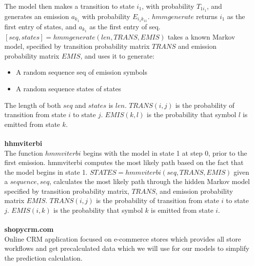 The model then makes a transition to state $i_1$, with probability $T_{1i_1}$, and generates an emission $a_k_1$ with probability $E_{i_1k_11}$.
$hmmgenerate$ returns $i_1$ as the first entry of states, and $a_k_1$ as the first entry of seq.
$[seq,states] = hmmgenerate(len,TRANS,EMIS)$ takes a known Markov model, specified by transition probability matrix $TRANS$ and emission probability matrix $EMIS$,
and uses it to generate:\\
\begin{itemize}
    \item A random sequence seq of emission symbols
    \item A random sequence states of states
\end{itemize}
The length of both $seq$ and $states$ is $len$.
$TRANS(i,j)$ is the probability of transition from state $i$ to state $j$.
$EMIS(k,l)$ is the probability that symbol $l$ is emitted from state $k$.\\
\\
\textbf{hhmviterbi}~\cite{hhmviterbi}\\
The function $hmmviterbi$ begins with the model in state 1 at step 0, prior to the first emission.
hmmviterbi computes the most likely path based on the fact that the model begins in state 1.
$STATES = hmmviterbi(seq,TRANS,EMIS)$ given a $sequence, seq$, calculates the most likely path through the hidden Markov model
specified by transition probability matrix, $TRANS$, and emission probability matrix $EMIS$. $TRANS(i,j)$ is the probability of transition from state $i$ to state $j$.
$EMIS(i,k)$ is the probability that symbol $k$ is emitted from state $i$.\\
\\
\textbf{shopycrm.com}\\
Online CRM application focused on e-commerce stores which provides all store workflows and get precalculated data which
we will use for our models to simplify the prediction calculation.
